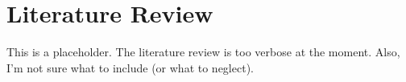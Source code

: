 \chapter{Literature Review}
This is a placeholder. 
The literature review is too verbose at the moment. 
Also, I'm not sure what to include (or what to neglect). 


